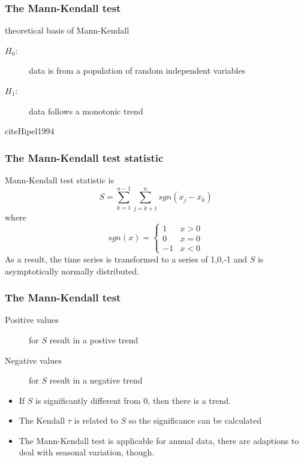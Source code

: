 \documentclass[xcolor=table, xcolor=dvipsnames]{beamer}\usepackage[]{graphicx}\usepackage[]{color}
\begin{document}

\begin{frame}[fragile]\frametitle{The Mann-Kendall test}
theoretical basis of Mann-Kendall
\begin{description}
 \item[$H_0$:] {data is from a population of random independent variables}
 \item[$H_1$:] {data follows a monotonic trend}
\end{description}
cite{Hipel1994}
\end{frame}


\begin{frame}[fragile]\frametitle{The Mann-Kendall test statistic}
Mann-Kendall test statistic is
\[ S = \sum_{k=1}^{n-1} \sum_{j=k+1}^{n} sgn(x_j -x_k)\]
where
 \[
sgn(x)=\begin{cases}
              1 & x>0\\
              0 & x=0\\
              -1 & x<0
              \end{cases}
 \]
 As a result, the time series is transformed to a series of 1,0,-1 and $S$ is asymptotically normally distributed.
\end{frame}


\begin{frame}[fragile]\frametitle{The Mann-Kendall test}
\begin{description}
\item[Positive values] for $S$ result in a postive trend
\item[Negative values] for $S$ result in a negative trend
\end{description}
\begin{itemize}
\item If $S$ is significantly different from 0, then there is a trend.
\item The Kendall $\tau$ is related to $S$ so the significance can be calculated 
\item The Mann-Kendall test is applicable for annual data, there are adaptions to deal with seasonal variation, though.
\end{itemize}
\end{frame}

\end{document}

